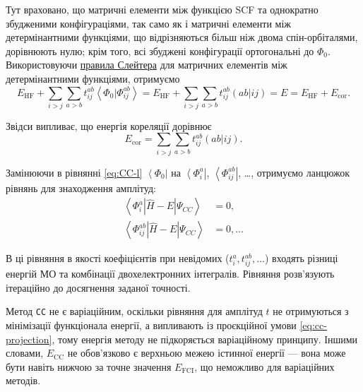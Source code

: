Тут враховано, що матричні елементи між функцією SCF та однократно збудженими конфігураціями, так само як і матричні елементи між детермінантними функціями, що відрізняються більш ніж двома спін-орбіталями, дорівнюють нулю; крім того, всі збуджені конфігурації ортогональні до \( \Phi_0 \). Використовуючи \href{https://en.wikipedia.org/wiki/Slater\%E2\%80\%93Condon_rules}{правила Слейтера} для матричних елементів між детермінантними функціями, отримуємо
\[ E_{\text{HF}} + \sum_{i>j} \sum_{a>b} t_{ij}^{ab} \left\langle \Phi_0 | \Phi_{ij}^{ab} \right\rangle = E_{\text{HF}} + \sum_{i>j} \sum_{a>b} t_{ij}^{ab} ( ab | ij ) = E = E_{\text{HF}} + E_{\text{cor}}. \]

Звідси випливає, що енергія кореляції дорівнює
\begin{equation*}
E_{\text{cor}} = \sum_{i>j} \sum_{a>b} t_{ij}^{ab} ( ab | ij ).
\end{equation*}

Замінюючи в рівнянні \eqref{eq:CC-l}
$ \left\langle \Phi_0 \right|$ на $\left\langle \Phi_i^a \right|$, $\left\langle \Phi_{ij}^{ab} \right|$, \ldots,
отримуємо ланцюжок рівнянь для знаходження амплітуд:
\begin{equation}\label{eq:cc-projection}
\begin{aligned}
\left\langle \Phi_i^a | \widehat{H} - E | \Psi_{CC} \right\rangle &= 0, \\
\left\langle \Phi_{ij}^{ab} | \widehat{H} - E | \Psi_{CC} \right\rangle &= 0, \ldots
\end{aligned}
\end{equation}

В ці рівняння в якості коефіцієнтів при невідомих (\( t_{i}^{a}, t_{ij}^{ab}, \ldots \)) входять різниці енергій МО та комбінації двохелектронних інтегралів. Рівняння розв'язують ітераційно до досягнення заданої точності.

\begin{commentbox}
Метод \texttt{CC} не є варіаційним, оскільки рівняння для амплітуд $t$ не отримуються з мінімізації функціонала енергії,
а випливають із проєкційної умови \eqref{eq:cc-projection}, тому енергія методу не підкоряється варіаційному принципу.
Іншими словами, $E_{\text{CC}}$ не обов’язково є верхньою межею істинної енергії ---
вона може бути навіть нижчою за точне значення $E_{\text{FCI}}$, що неможливо для варіаційних методів.
\end{commentbox}



